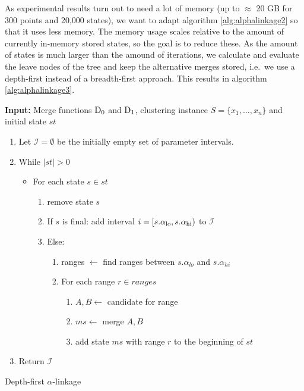 As experimental results turn out to need a lot of memory (up to $\approx$ 20 GB for 300 points and 20,000 states), we want to adapt algorithm \ref{alg:alphalinkage2} so that it uses less memory. The memory usage scales relative to the amount of currently in-memory stored states, so the goal is to reduce these. As the amount of states is much larger than the amound of iterations, we calculate and evaluate the leave nodes of the tree and keep the alternative merges stored, i.e.\ we use a depth-first instead of a breadth-first approach. This results in algorithm \ref{alg:alphalinkage3}.

\begin{algorithm}
    \textbf{Input:} Merge functions $\operatorname{D_{0}}$ and $\operatorname{D_{1}}$, clustering instance $S = \{x_1, \dots, x_n\}$ and initial state $st$
    \begin{enumerate}[nosep, leftmargin=*]
    \item Let $\mathcal{I} = \emptyset$ be the initially empty set of parameter intervals.
    \item While $|st| > 0$
    \begin{itemize}[nosep, leftmargin=*]
        \item For each state $s \in st$
        \begin{enumerate}
            \item remove state $s$\;
            \item If $s$ is final: add interval $i = [s.\alpha_\text{lo}, s.\alpha_\text{hi})$ to $\mathcal{I}$
            \item Else: 
            \begin{enumerate}
                \item ranges $\gets$ find ranges between $s.\alpha_{lo}$ and $s.\alpha_{hi}$
                \item For each range $r \in ranges$
                \begin{enumerate}
                    \item $A, B \gets$ candidate for range
                    \item $ms \gets$ merge $A, B$
                    \item add state $ms$ with range $r$ to the beginning of $st$
                \end{enumerate}
            \end{enumerate}
        \end{enumerate}
    \end{itemize}
    \item Return $\mathcal{I}$
    \end{enumerate}
    \caption{Depth-first $\alpha$-linkage}
    \label{alg:alphalinkage3}
\end{algorithm}

